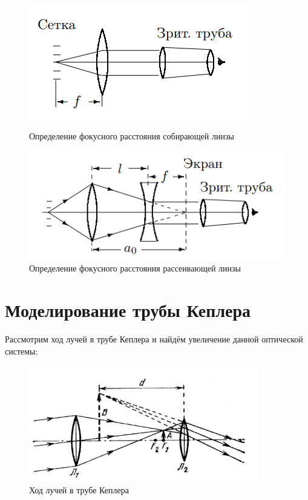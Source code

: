 \documentclass[15pt,a5paper,reqno]{article}
\begin{document}
\begin{figure}[h!]
    \begin{center}
        \begin{minipage}[h!]{0.60\linewidth}
            \includegraphics[width=1\linewidth]{pics/plus_lens.png}
            \caption{Определение фокусного расстояния собирающей линзы} %
        \label{} 
        \end{minipage}

        \hfill 

        \begin{minipage}[h!]{0.60\linewidth}
            \includegraphics[width=1\linewidth]{pics/minus_lens.png}
            \caption{Определение фокусного расстояния рассеивающей линзы}
        \label{}
    \end{minipage}
    \end{center}
\end{figure}

\section{Моделирование трубы Кеплера}

Рассмотрим ход лучей в трубе Кеплера и найдём увеличение данной оптической системы:
    
\begin{figure}[h!]
    \centering
        \includegraphics[width=10cm]{pics/kepler.png}
    \caption{Ход лучей в трубе Кеплера}
    \label{}
\end{figure}
\end{document}
